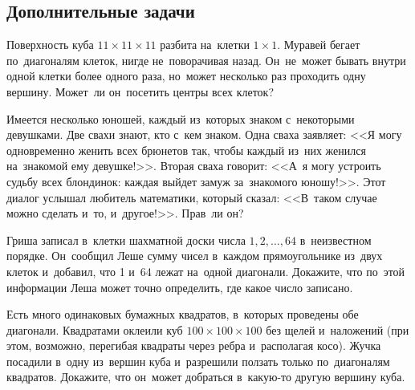 

\subsection*{Дополнительные задачи}



\begin{problems}

\item
Поверхность куба $11 \times 11 \times 11$ разбита на~клетки $1 \times 1$.
Муравей бегает по~диагоналям клеток, нигде не~поворачивая назад.
Он~не~может бывать внутри одной клетки более одного раза, но~может несколько
раз проходить одну вершину.
Может~ли он~посетить центры всех клеток?

\item
Имеется несколько юношей, каждый из~которых знаком с~некоторыми девушками.
Две свахи знают, кто с~кем знаком.
Одна сваха заявляет:
<<Я могу одновременно женить всех брюнетов так, чтобы каждый из~них женился
на~знакомой ему девушке!>>.
Вторая сваха говорит:
<<А~я могу устроить судьбу всех блондинок: каждая выйдет замуж за~знакомого
юношу!>>.
Этот диалог услышал любитель математики, который сказал:
<<В~таком случае можно сделать и~то, и~другое!>>.
Прав~ли он?

\item
Гриша записал в~клетки шахматной доски числа $1, 2, \ldots, 64$ в~неизвестном
порядке.
Он~сообщил Леше сумму чисел в~каждом прямоугольнике из~двух клеток и~добавил,
что 1 и~64 лежат на~одной диагонали.
Докажите, что по~этой информации Леша может точно определить, где какое число
записано.

\item
Есть много одинаковых бумажных квадратов, в~которых проведены обе диагонали.
Квадратами оклеили куб $100 \times 100 \times 100$ без щелей и~наложений
(при этом, возможно, перегибая квадраты через ребра и~располагая косо).
Жучка посадили в~одну из~вершин куба и~разрешили ползать только по~диагоналям
квадратов.
Докажите, что он~может добраться в~какую-то другую вершину куба.

\end{problems}

